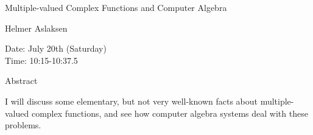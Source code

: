 \begin{center}
\LARGE
Multiple-valued Complex Functions and Computer Algebra
\end{center}

\begin{center}
\Large
Helmer Aslaksen
\end{center}

\noindent
Date:  July 20th (Saturday) \\
Time:  10:15-10:37.5\\

\begin{center}
\large
Abstract
\end{center}

I will discuss some elementary, but not very well-known facts about multiple-valued complex
functions, and see how computer algebra systems deal with these problems. 

